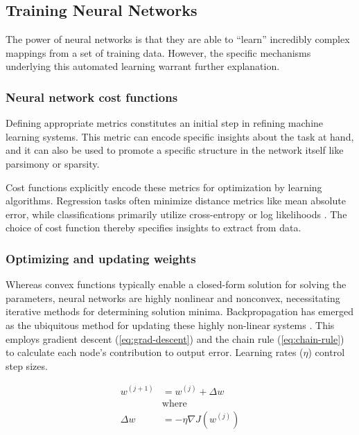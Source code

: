 \subsection{Training Neural Networks}

The power of neural networks is that they are able to ``learn'' incredibly complex mappings from a set of training data.
However, the specific mechanisms underlying this automated learning warrant further explanation.

\subsubsection{Neural network cost functions}

Defining appropriate metrics constitutes an initial step in refining machine learning systems.
This metric can encode specific insights about the task at hand, and it can also be used to promote a specific structure in the network itself like parsimony or sparsity.

Cost functions explicitly encode these metrics for optimization by learning algorithms.
Regression tasks often minimize distance metrics like mean absolute error, while classifications primarily utilize cross-entropy or log likelihoods \cite{paszkePyTorchImperativeStyle2019}.
The choice of cost function thereby specifies insights to extract from data.

\subsubsection{Optimizing and updating weights}

Whereas convex functions typically enable a closed-form solution \cite{boydConvexOptimization2004} for solving the parameters, neural networks are highly nonlinear and nonconvex, necessitating iterative methods for determining solution minima.
Backpropagation has emerged as the ubiquitous method for updating these highly non-linear systems \cite{rumelhartLearningRepresentationsBackpropagating1986}.
This employs gradient descent (\cref{eq:grad-descent}) and the chain rule (\cref{eq:chain-rule}) to calculate each node's contribution to output error.
Learning rates ($\eta$) control step sizes.

\begin{equation}
    \begin{aligned}
        w^{(j+1)} &= w^{(j)} + \Delta w\\
        &\text{where} \\
        \Delta w &= -\eta \nabla J(w^{(j)})
    \end{aligned}
    \label{eq:grad-descent}
\end{equation}


